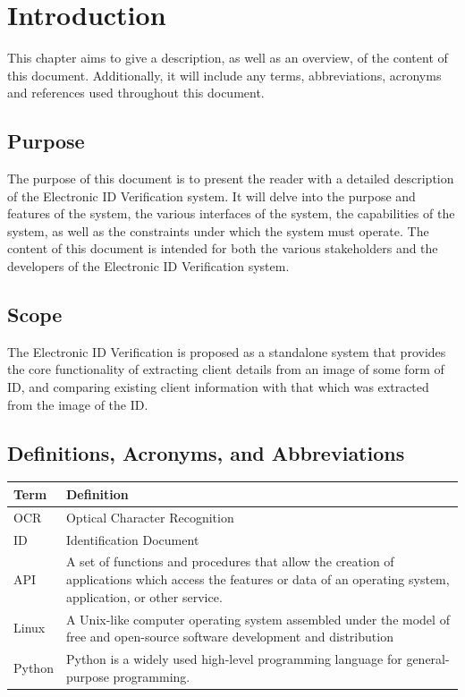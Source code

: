 \documentclass{article}
\def \project{Electronic ID Verification }
\begin{document}
\cleardoublepage
\thispagestyle{empty}
\tableofcontents
\newpage

\setcounter{page}{1}
	\section{Introduction}\label{sec:intro}
		This chapter aims to give a description, as well as an overview, of the content of this document. Additionally, it will include any terms, abbreviations, acronyms and references used throughout this document.

		\subsection{Purpose}\label{subsec:purpose}
			The purpose of this document is to present the reader with a detailed description of the \project system. It will delve into the purpose and features of the system, the various interfaces of the system, the capabilities of the system, as well as the constraints under which the system must operate. The content of this document is intended for both the various stakeholders and the developers of the \project system.

		\subsection{Scope}\label{subsec:scope}
			The \project is proposed as a standalone system that provides the core functionality of extracting client details from an image of some form of ID, and comparing existing client information with that which was extracted from the image of the ID.

		\subsection{Definitions, Acronyms, and Abbreviations}\label{subsec:daa}
			\begin{table}[h!]
				\centering
				\label{tab: Table 1}
				\begin{tabular}{| m{4cm} | m{12cm} |}
					\hline
                        \textbf{Term} & \textbf{Definition}\\
					\hline
				    	OCR & Optical Character Recognition\\
				    \hline
			            ID & Identification Document\\
					
				    \hline
				        API & A set of functions and procedures that allow the creation of applications which access the features or data of an operating system, application, or other service. \\
				    \hline
				        Linux &  A Unix-like computer operating system assembled under the model of free and open-source software development and distribution\\
					\hline
					    Python & Python is a widely used high-level programming language for general-purpose programming.\\
					\hline
                    
				\end{tabular}
			\end{table}
		    
\end{document}
